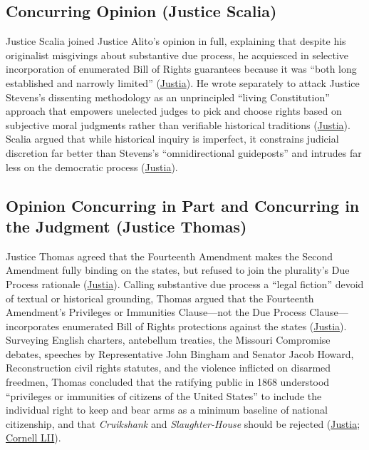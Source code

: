 \documentclass[12pt]{article}
\begin{document}
\subsection{Concurring Opinion (Justice Scalia)}

Justice Scalia joined Justice Alito's opinion in full, explaining that despite his originalist misgivings about substantive due process, he acquiesced in selective incorporation of enumerated Bill of Rights guarantees because it was ``both long established and narrowly limited'' (\href{https://supreme.justia.com/cases/federal/us/561/742/}{Justia}). He wrote separately to attack Justice Stevens's dissenting methodology as an unprincipled ``living Constitution'' approach that empowers unelected judges to pick and choose rights based on subjective moral judgments rather than verifiable historical traditions (\href{https://supreme.justia.com/cases/federal/us/561/742/}{Justia}). Scalia argued that while historical inquiry is imperfect, it constrains judicial discretion far better than Stevens's ``omnidirectional guideposts'' and intrudes far less on the democratic process (\href{https://supreme.justia.com/cases/federal/us/561/742/}{Justia}).

\subsection{Opinion Concurring in Part and Concurring in the Judgment (Justice Thomas)}

Justice Thomas agreed that the Fourteenth Amendment makes the Second Amendment fully binding on the states, but refused to join the plurality's Due Process rationale (\href{https://supreme.justia.com/cases/federal/us/561/742/}{Justia}). Calling substantive due process a ``legal fiction'' devoid of textual or historical grounding, Thomas argued that the Fourteenth Amendment's Privileges or Immunities Clause---not the Due Process Clause---incorporates enumerated Bill of Rights protections against the states (\href{https://supreme.justia.com/cases/federal/us/561/742/}{Justia}). Surveying English charters, antebellum treaties, the Missouri Compromise debates, speeches by Representative John Bingham and Senator Jacob Howard, Reconstruction civil rights statutes, and the violence inflicted on disarmed freedmen, Thomas concluded that the ratifying public in 1868 understood ``privileges or immunities of citizens of the United States'' to include the individual right to keep and bear arms as a minimum baseline of national citizenship, and that \textit{Cruikshank} and \textit{Slaughter-House} should be rejected (\href{https://supreme.justia.com/cases/federal/us/561/742/}{Justia}; \href{https://www.law.cornell.edu/constitution-conan/amendment-2/post-heller-issues-and-application-of-second-amendment-to-states}{Cornell LII}).
\end{document}
